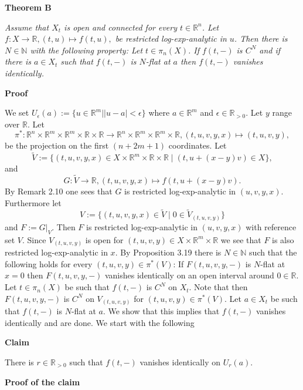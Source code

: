 \documentclass[12pt]{article}
\def\vs{\vspace}
\begin{document}
\vs{0.5cm}
{\bf Theorem B}

\vs{0.1cm}
{\it Assume that $X_t$ is open and connected for every $t \in \mathbb{R}^n$. Let $f:X \to \mathbb{R}, (t,u) \mapsto f(t,u),$ be restricted log-exp-analytic in $u$. Then there is $N \in \mathbb{N}$ with the following property: Let $t \in \pi_n(X)$. If $f(t,-)$ is $C^N$ and if there is $a \in X_t$ such that $f(t,-)$ is $N$-flat at $a$ then $f(t,-)$ vanishes identically.} 	

\vs{0.4cm}
{\bf Proof}

\vs{0.1cm}
We set $U_\epsilon(a):=\{u \in \mathbb{R}^m \mid \vert{u-a}\vert<\epsilon\}$ where $a \in \mathbb{R}^m$ and $\epsilon \in \mathbb{R}_{>0}$. Let $y$ range over $\mathbb{R}$. Let 
$$\pi^*:\mathbb{R}^n \times \mathbb{R}^m \times \mathbb{R}^m \times \mathbb{R} \times \mathbb{R} \to \mathbb{R}^n \times \mathbb{R}^m \times \mathbb{R}^m \times \mathbb{R}, (t,u,v,y,x) \mapsto (t,u,v,y),$$
be the projection on the first $(n+2m+1)$ coordinates. Let 
$$\tilde{V}:=\{(t,u,v,y,x) \in X \times \mathbb{R}^m \times \mathbb{R} \times \mathbb{R} \mid (t,u+(x-y)v) \in X\},$$
and
$$G:\tilde{V} \to \mathbb{R}, (t,u,v,y,x) \mapsto f(t,u+(x-y)v).$$
By Remark 2.10 one sees that $G$ is restricted log-exp-analytic in $(u,v,y,x)$. Furthermore let
$$V:=\{(t,u,v,y,x) \in \tilde{V} \mid 0 \in \tilde{V}_{(t,u,v,y)}\}$$
and $F:=G|_V$. Then $F$ is restricted log-exp-analytic in $(u,v,y,x)$ with reference set $V$. Since $V_{(t,u,v,y)}$ is open for $(t,u,v,y) \in X \times \mathbb{R}^m \times \mathbb{R}$ we see that $F$ is also restricted log-exp-analytic in $x$. By Proposition 3.19 there is $N \in \mathbb{N}$ such that the following holds for every $(t,u,v,y) \in \pi^*(V)$: If $F(t,u,v,y,-)$ is $N$-flat at $x=0$ then $F(t,u,v,y,-)$ vanishes identically on an open interval around $0 \in \mathbb{R}$. Let $t \in \pi_n(X)$ be such that $f(t,-)$ is $C^N$ on $X_t$. Note that then $F(t,u,v,y,-)$ is $C^N$ on $V_{(t,u,v,y)}$ for $(t,u,v,y) \in \pi^*(V)$. Let $a \in X_t$ be such that $f(t,-)$ is $N$-flat at $a$. We show that this implies that $f(t,-)$ vanishes identically and are done. We start with the following 

\vs{0.3cm}
{\bf Claim}

\vs{0.1cm}
There is $r \in \mathbb{R}_{>0}$ such that $f(t,-)$ vanishes identically on $U_r(a)$.

\vs{0.3cm}
{\bf Proof of the claim}
\end{document}

